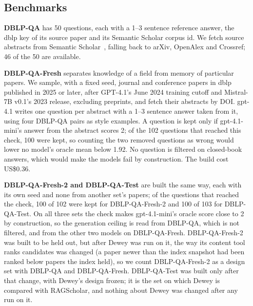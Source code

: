 \documentclass[conference]{IEEEtran}
\newcommand{\dq}{DBLP-QA}
\newcommand{\fresh}{DBLP-QA-Fresh}
\newcommand{\freshb}{DBLP-QA-Fresh-2}
\newcommand{\test}{DBLP-QA-Test}
\begin{document}
\subsection{Benchmarks}
\label{sec:benchmarks}

\textbf{\dq{}} has 50 questions, each with a 1--3 sentence reference answer, the dblp key of its source
paper and its Semantic Scholar corpus id. We fetch source abstracts from Semantic
Scholar~\cite{kinney2023s2}, falling back to arXiv, OpenAlex and Crossref; 46 of the 50 are available.

\textbf{\fresh{}} separates knowledge of a field from memory of particular papers. We sample, with a
fixed seed, journal and conference papers in dblp published in 2025 or later, after GPT-4.1's June 2024
training cutoff and Mistral-7B v0.1's 2023 release, excluding preprints, and fetch their abstracts by
DOI. gpt-4.1 writes one question per abstract with a 1--3 sentence answer taken from it, using four \dq{}
pairs as style examples. A question is kept only if gpt-4.1-mini's answer from the abstract scores 2; of
the 102 questions that reached this check, 100 were kept, so counting the two removed questions as wrong
would lower no model's oracle mean below 1.92. No question is filtered on closed-book answers, which would
make the models fail by construction. The build cost US\$0.36.

\textbf{\freshb{} and \test{}} are built the same way, each with its own seed and none from another
set's papers; of the questions that reached the check, 100 of 102 were kept for \freshb{} and 100 of 103
for \test{}. On all three sets the check makes gpt-4.1-mini's oracle score close to 2 by construction, so
the generation ceiling is read from \dq{}, which is not filtered, and from the other two models on \fresh{}.
\freshb{} was built to be held out, but after Dewey was run on it, the way its content tool ranks
candidates was changed (a paper newer than the index snapshot had been ranked below papers the index
held), so we count \freshb{} as a design set with \dq{} and \fresh{}. \test{} was built only after that
change, with Dewey's design frozen; it is the set on which Dewey is compared with RAGScholar, and nothing
about Dewey was changed after any run on it.
\end{document}
